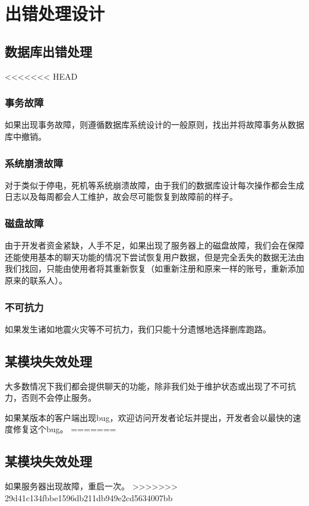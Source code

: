 \chapter{出错处理设计}
\section{数据库出错处理}
<<<<<<< HEAD
\subsection{事务故障}
如果出现事务故障，则遵循数据库系统设计的一般原则，找出并将故障事务从数据库中撤销。
\subsection{系统崩溃故障}
对于类似于停电，死机等系统崩溃故障，由于我们的数据库设计每次操作都会生成日志以及每周都会人工维护，故会尽可能恢复到故障前的样子。
\subsection{磁盘故障}
由于开发者资金紧缺，人手不足，如果出现了服务器上的磁盘故障，我们会在保障还能使用基本的聊天功能的情况下尝试恢复用户数据，但是完全丢失的数据无法由我们找回，只能由使用者将其重新恢复（如重新注册和原来一样的账号，重新添加原来的联系人）。
\subsection{不可抗力}
如果发生诸如地震火灾等不可抗力，我们只能十分遗憾地选择删库跑路。

\section{某模块失效处理}
大多数情况下我们都会提供聊天的功能，除非我们处于维护状态或出现了不可抗力，否则不会停止服务。

如果某版本的客户端出现bug，欢迎访问开发者论坛并提出，开发者会以最快的速度修复这个bug。
=======

\section{某模块失效处理}
如果服务器出现故障，重启一次。
>>>>>>> 29d41c134fbbe1596db211db949e2cd5634007bb
